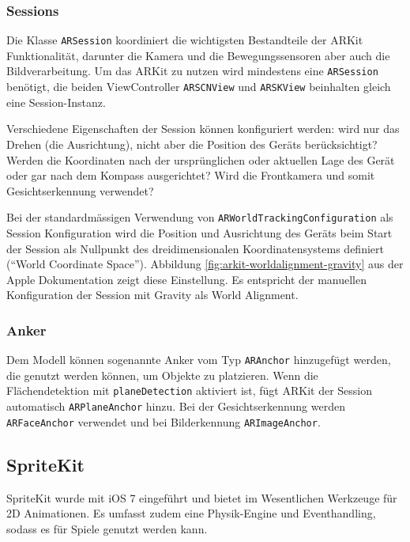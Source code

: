 \subsubsection{Sessions}
Die Klasse \texttt{ARSession} koordiniert die wichtigsten Bestandteile der ARKit Funktionalität, darunter die Kamera und die Bewegungssensoren aber auch die Bildverarbeitung. Um das ARKit zu nutzen wird mindestens eine \texttt{ARSession} benötigt, die beiden ViewController \texttt{ARSCNView} und \texttt{ARSKView} beinhalten gleich eine Session-Instanz.

Verschiedene Eigenschaften der Session können konfiguriert werden: wird nur das Drehen (die Ausrichtung), nicht aber die Position des Geräts berücksichtigt? Werden die Koordinaten nach der ursprünglichen oder aktuellen Lage des Gerät oder gar nach dem Kompass ausgerichtet? Wird die Frontkamera und somit Gesichtserkennung verwendet?

Bei der standardmässigen Verwendung von \texttt{ARWorldTrackingConfiguration} als Session Konfiguration wird die Position und Ausrichtung des Geräts beim Start der Session als Nullpunkt des dreidimensionalen Koordinatensystems definiert ("`World Coordinate Space"'). Abbildung \ref{fig:arkit-worldalignment-gravity} aus der Apple Dokumentation zeigt diese Einstellung. Es entspricht der manuellen Konfiguration der Session mit Gravity als World Alignment.


\subsubsection{Anker}
Dem Modell können sogenannte Anker vom Typ \texttt{ARAnchor} hinzugefügt werden, die genutzt werden können, um Objekte zu platzieren. Wenn die Flächendetektion mit \texttt{planeDetection} aktiviert ist, fügt ARKit der Session automatisch \texttt{ARPlaneAnchor} hinzu. Bei der Gesichtserkennung werden \texttt{ARFaceAnchor} verwendet und bei Bilderkennung \texttt{ARImageAnchor}.

\subsection{SpriteKit}
SpriteKit wurde mit iOS 7 eingeführt und bietet im Wesentlichen Werkzeuge für 2D Animationen. Es umfasst zudem eine Physik-Engine und Eventhandling, sodass es für Spiele genutzt werden kann.



